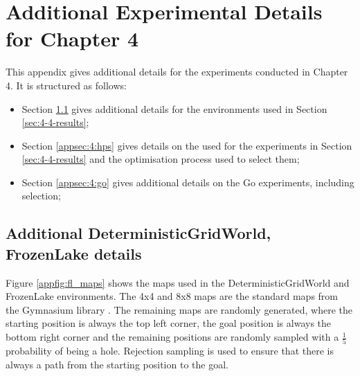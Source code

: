 










\chapter{\label{app:expr-deets-ch4}Additional Experimental Details for Chapter 4}

    \minitoc

    This appendix gives additional details for the experiments conducted in Chapter 4. It is structured as follows:
    \begin{itemize}
        \item Section \ref{appsec:4:envs} gives additional details for the environments used in Section \ref{sec:4-4-results};
        \item Section \ref{appsec:4:hps} gives details on the  used for the experiments in Section \ref{sec:4-4-results} and the optimisation process used to select them;
        \item Section \ref{appsec:4:go} gives additional details on the Go experiments, including  selection;
    \end{itemize}




















\section{Additional DeterministicGridWorld, FrozenLake details}
\label{appsec:4:envs}

    Figure \ref{appfig:fl_maps} shows the maps used in the DeterministicGridWorld and FrozenLake environments. The 4x4 and 8x8 maps are the standard maps from the Gymnasium library \cite{gymnasium}. The remaining maps are randomly generated, where the starting position is always the top left corner, the goal position is always the bottom right corner and the remaining positions are randomly sampled with a $\frac{1}{5}$ probability of being a hole. Rejection sampling is used to ensure that there is always a path from the starting position to the goal.
    

